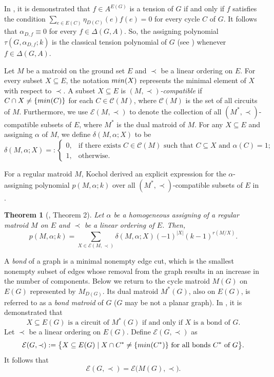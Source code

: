 \documentclass[12pt]{article}%
\numberwithin{equation}{section}
\newtheorem{theorem}{Theorem}[section]
\begin{document}
In \cite[Proposition 2.2]{Kochol2002}, it is demonstrated that $f\in A^{E(G)}$ is a tension of $G$ if and only if $f$ satisfies the condition $\sum_{e\in E(C)}\eta_{D(C)}(e)f(e)=0$ for every cycle $C$ of $G$. It follows that $\alpha_{D,f}\equiv 0$ for every $f\in\Delta(G,A)$. So, the assigning polynomial $\tau(G,\alpha_{D,f};k)$ is the classical tension polynomial of $G$ (see \cite{Kochol2002}) whenever $f\in\Delta(G,A)$.

Let $M$ be a matroid on the ground  set $E$ and $\prec$ be a linear ordering on $E$. For every subset $X\subseteq E$, the notation ${\rm min}(X)$ represents the minimal element of $X$ with respect to $\prec$. A subset  $X\subseteq E$ is {\em $(M,\prec)$-compatible} if $C\cap X\ne\{{\rm min}(C)\}$ for each $C\in\mathcal{C}(M)$, where $\mathcal{C}(M)$ is the set of all circuits of $M$. Furthermore, we use $\mathcal{E}(M,\prec)$ to denote the collection of all $(M^*,\prec)$-compatible subsets of $E$, where $M^*$ is the dual matroid of $M$. For any $X\subseteq E$ and assigning $\alpha$ of $M$, we define $\delta(M,\alpha;X)$ to be
\[
\delta(M,\alpha;X)=:
\begin{cases}
0,&\text{if there exists $C\in\mathcal{C}(M)$ such that $C\subseteq X$ and $\alpha(C)=1$};\\
1,&\text{otherwise}.
\end{cases}
\]  

For a regular matroid $M$, Kochol derived  an explicit expression for the $\alpha$-assigning polynomial $p(M,\alpha;k)$ over all $(M^*,\prec)$-compatible subsets of $E$ in \cite[Theorem 2]{Kochol2024}.
\begin{theorem}[\cite{Kochol2024}, Theorem 2]\label{Linear-Ordering}
Let $\alpha$ be a homogeneous assigning of a regular matroid $M$ on $E$ and $\prec$ be a linear ordering of $E$. Then,
\[
p(M,\alpha;k)=\sum_{X\in\mathcal{E}(M,\prec)}\delta(M,\alpha;X)(-1)^{|X|}(k-1)^{r(M/X)}.
\]
\end{theorem}

A {\em bond} of a graph is a minimal nonempty edge cut, which is the smallest nonempty subset of edges whose removal from the graph results in an increase in the number of components. Below we return to the cycle matroid $M(G)$ on $E(G)$ represented by $M_{D(G)}$. Its dual matroid $M^*(G)$, also on $E(G)$, is referred to as a {\em bond matroid} of $G$ ($G$ may be not a planar graph). In \cite[Proposition 2.3.1]{Oxley2011},  it is demonstrated that
\[
\text{$X\subseteq E(G)$ is a circuit of $M^*(G)$ if and only if $X$ is a bond of $G$}.
\] 
Let $\prec$ be a linear ordering on $E(G)$. Define $\mathcal{E}(G,\prec)$ as 
\[
\mathcal{E}(G,\prec):=\big\{X\subseteq E(G)\mid X\cap C^*\ne \{{\rm min}(C^*)\}\text{ for all bonds $C^*$ of  $G$}\big\}.
\]
It follows that
\begin{equation}\label{A2=B2}
\mathcal{E}(G,\prec)=\mathcal{E}\big(M(G),\prec\big).
\end{equation}
\end{document}

